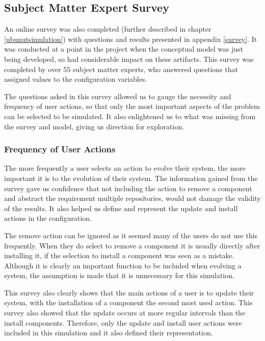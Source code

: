 \subsection{Subject Matter Expert Survey}
An online survey was also completed (further described in chapter \ref{ubunutsimulation}) with questions and results presented in appendix \ref{survey}.
It was conducted at a point in the project when the conceptual model was just being developed, so had considerable impact on these artifacts.
This survey was completed by over 55 subject matter experts, who answered questions that assigned values to the configuration variables.

The questions asked in this survey allowed us to gauge the necessity and frequency of user actions,
so that only the most important aspects of the problem can be selected to be simulated.
It also enlightened us to what was missing from the survey and model, giving us direction for exploration.


\subsubsection{Frequency of User Actions}
The more frequently a user selects an action to evolve their system, the more important it is to the evolution of their system.
The information gained from the survey gave us confidence that not including the action to remove a component and abstract the requirement multiple repositories, 
would not damage the validity of the results.
It also helped us define and represent the update and install actions in the configuration.

The remove action can be ignored as it seemed many of the users do not use this frequently.
When they do select to remove a component it is usually directly after installing it, if the selection to install a component was seen as a mistake.
Although it is clearly an important function to be included when evolving a system, the assumption is made that it is unnecessary for this simulation.

This survey also clearly shows that the main actions of a user is to update their system,
with the installation of a component the second most used action.
This survey also showed that the update occurs at more regular intervals than the install components.
Therefore, only the update and install user actions were included in this simulation and it also defined their representation. 

